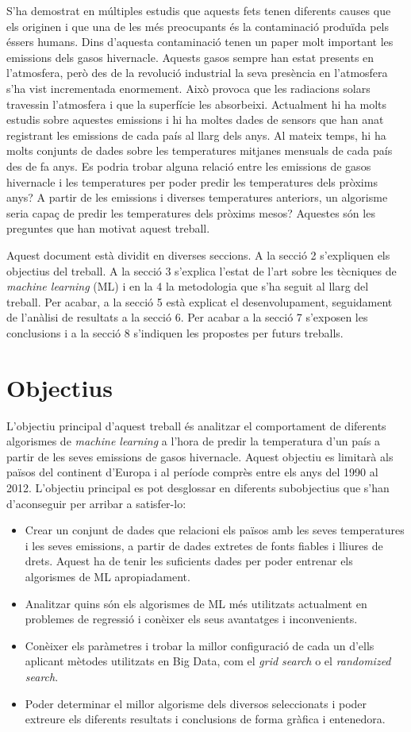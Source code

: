 \documentclass[10pt,a4paper,twocolumn,twoside]{article}
\begin{document}
S'ha demostrat en múltiples estudis que aquests fets tenen diferents causes que els originen i que una de les més preocupants és la contaminació produïda pels éssers humans. Dins d'aquesta contaminació tenen un paper molt important les emissions dels gasos hivernacle. Aquests gasos sempre han estat presents en l'atmosfera, però des de la revolució industrial la seva presència en l'atmosfera s'ha vist incrementada enormement. Això provoca que les radiacions solars travessin l'atmosfera i que la superfície les absorbeixi. Actualment hi ha molts estudis sobre aquestes emissions i hi ha moltes dades de sensors que han anat registrant les emissions de cada país al llarg dels anys. Al mateix temps, hi ha molts conjunts de dades sobre les temperatures mitjanes mensuals de cada país des de fa anys. Es podria trobar alguna relació entre les emissions de gasos hivernacle i les temperatures per poder predir les temperatures dels pròxims anys? A partir de les emissions i diverses temperatures anteriors, un algorisme seria capaç de predir les temperatures dels pròxims mesos? Aquestes són les preguntes que han motivat aquest treball.

Aquest document està dividit en diverses seccions. A la secció 2 s'expliquen els objectius del treball. A la  secció 3 s'explica l'estat de l'art sobre les tècniques de \textit{machine learning} (ML) i en la 4 la metodologia que s'ha seguit al llarg del treball. Per acabar, a la secció 5 està explicat el desenvolupament, seguidament de l'anàlisi de resultats a la secció 6. Per acabar a la secció 7 s'exposen les conclusions i a la secció 8 s'indiquen les propostes per futurs treballs.   
\section{Objectius}
L'objectiu principal d'aquest treball és analitzar el comportament de diferents algorismes de \textit{machine learning} a l'hora de predir la temperatura d'un país a partir de les seves emissions de gasos hivernacle. Aquest objectiu es limitarà als països del continent d'Europa i al període comprès entre els anys del 1990 al 2012. L'objectiu principal es pot desglossar en diferents subobjectius que s'han d'aconseguir per arribar a satisfer-lo:
\begin{itemize}
\item Crear un conjunt de dades que relacioni els països amb les seves temperatures i les seves emissions, a partir de dades extretes de fonts fiables i lliures de drets. Aquest ha de tenir les suficients dades per poder entrenar els algorismes de ML apropiadament.
\item Analitzar quins són els algorismes de ML més utilitzats actualment en problemes de regressió i conèixer els seus avantatges i inconvenients.
\item Conèixer els paràmetres i trobar la millor configuració de cada un d'ells aplicant mètodes utilitzats en Big Data, com el \textit{grid search} o el \textit{randomized search}.
\item Poder determinar el millor algorisme dels diversos seleccionats i poder extreure els diferents resultats i conclusions de forma gràfica i entenedora.  
\end{itemize}
\end{document}
